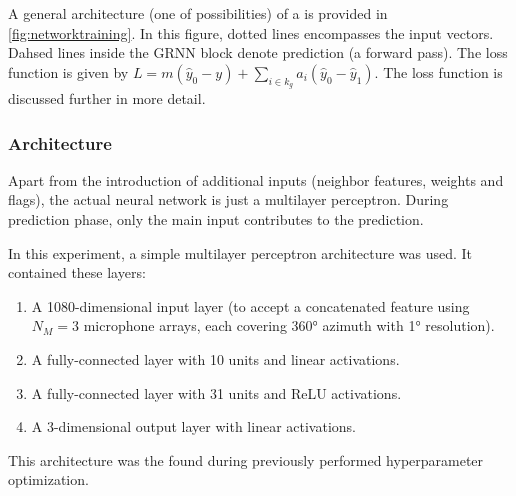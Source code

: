\documentclass[applsci,article,submit,moreauthors,pdftex]{Definitions/mdpi}
\begin{document}
A general architecture (one of possibilities) of a \grnn is provided in \figurename{} \ref{fig:networktraining}. In this figure, dotted lines encompasses the input vectors. Dahsed lines inside the GRNN block denote prediction (a forward pass). The loss function is given by $ L = m(\hat{y}_0-y) + \sum_{i \in k_g}a_i(\hat{y}_0 - \hat{y}_1) $. The loss function is discussed further in more detail.



\subsubsection{Architecture}
Apart from the introduction of additional inputs (neighbor features, weights and flags), the actual neural network is just a multilayer perceptron. During prediction phase, only the main input contributes to the prediction.

In this experiment, a simple multilayer perceptron architecture was used. 
It contained these layers:
\begin{enumerate}
	\item A 1080-dimensional input layer (to accept a concatenated \srpphat{} feature using $ N_M = 3 $ microphone arrays, each covering \ang{360} azimuth with \ang{1} resolution).
	\item A fully-connected layer with 10 units and linear activations.
	\item A fully-connected layer with 31 units and ReLU activations.
	\item A 3-dimensional output layer with linear activations.
\end{enumerate}

This architecture was the found during previously performed hyperparameter optimization.
\end{document}
